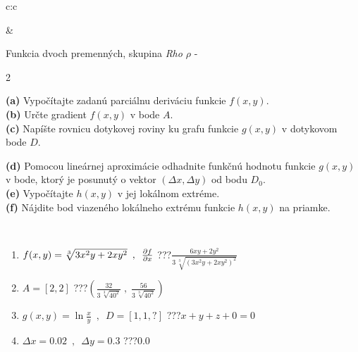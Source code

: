 \documentclass[10pt]{report}
\begin{document}
\begin{tabular}{c:c}
\begin{minipage}[c][104.5mm][t]{0.5\linewidth}
\begin{center}
\end{center}
\end{minipage}
&
\begin{minipage}[c][104.5mm][t]{0.5\linewidth}
\begin{center}
\vspace{7mm}
{\huge \LARGE Funkcia dvoch premenných, skupina \textit{Rho $\rho$} -}\\[5mm]
\begin{minipage}{0.95\linewidth}
\begin{center}
{\small \begin{multicols}{2} \raggedright
\textbf{(a)} Vypočítajte zadanú parciálnu deriváciu funkcie \(f(x,y)\). \\[1mm]
\textbf{(b)} Určte gradient \(f(x,y)\) v bode \(A\). \\[1mm]
\textbf{(c)} Napíšte rovnicu dotykovej roviny ku grafu funkcie \(g(x,y)\) v dotykovom bode \(D\). \par \columnbreak
\textbf{(d)} Pomocou lineárnej aproximácie odhadnite funkčnú hodnotu funkcie \(g(x,y)\) v bode, ktorý je posunutý o vektor \((\Delta x, \Delta y)\) od bodu \(D_0\). \\[1mm]
\textbf{(e)} Vypočítajte \(h(x,y)\) v jej lokálnom extréme. \\[1mm]
\textbf{(f)} Nájdite bod viazeného lokálneho extrému funkcie \(h(x,y)\) na priamke. \\[1mm]
\end{multicols}
}
\end{center}
\end{minipage}
\\[4mm]
\begin{minipage}{0.79\linewidth}
\begin{center}
\begin{varwidth}{\linewidth}
\begin{enumerate}
\normalsizerr
\item $f(x,y) = \sqrt[3]{3x^2y + 2xy^2}\enspace , \enspace \pdv{f}{x}$\quad \dotfill\; ???\;\dotfill \quad $\frac{6xy+2y^2}{3\,\sqrt[3]{(3x^2y+2xy^2)^{2}}}$
\item $A = [2, 2]$\quad \dotfill\; ???\;\dotfill \quad $\left( \frac{32}{3\,\sqrt[3]{40^2}} \;,\; \frac{56}{3\,\sqrt[3]{40^2}} \right)$
\item $g(x,y) = \ln\frac{x}{y} \enspace , \enspace D=[1,1,?]$\quad \dotfill\; ???\;\dotfill \quad $x + y + z + 0 = 0$
\item $\Delta x = {0.02} \enspace,\enspace \Delta y = {0.3}$\quad \dotfill\; ???\;\dotfill \quad $0.0$

\end{enumerate}
\end{varwidth}
\end{center}
\end{minipage}
\end{center}
\end{minipage}
\end{tabular}
\end{document}
